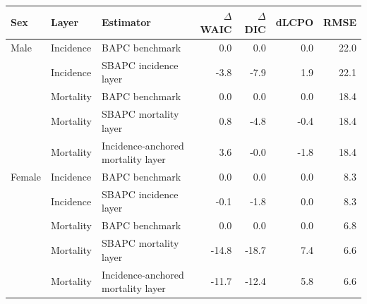 \begingroup
\renewcommand{\arraystretch}{1.08}
\setlength{\tabcolsep}{4pt}
\begin{tabular}{lllrrrr}
\toprule
Sex & Layer & Estimator & $\Delta$WAIC & $\Delta$DIC & dLCPO & RMSE \\
\midrule
Male & Incidence & BAPC benchmark & 0.0 & 0.0 & 0.0 & 22.0 \\
 & Incidence & SBAPC incidence layer & -3.8 & -7.9 & 1.9 & 22.1 \\
 & Mortality & BAPC benchmark & 0.0 & 0.0 & 0.0 & 18.4 \\
 & Mortality & SBAPC mortality layer & 0.8 & -4.8 & -0.4 & 18.4 \\
 & Mortality & Incidence-anchored mortality layer & 3.6 & -0.0 & -1.8 & 18.4 \\
\midrule
Female & Incidence & BAPC benchmark & 0.0 & 0.0 & 0.0 & 8.3 \\
 & Incidence & SBAPC incidence layer & -0.1 & -1.8 & 0.0 & 8.3 \\
 & Mortality & BAPC benchmark & 0.0 & 0.0 & 0.0 & 6.8 \\
 & Mortality & SBAPC mortality layer & -14.8 & -18.7 & 7.4 & 6.6 \\
 & Mortality & Incidence-anchored mortality layer & -11.7 & -12.4 & 5.8 & 6.6 \\
\bottomrule
\end{tabular}
\endgroup
